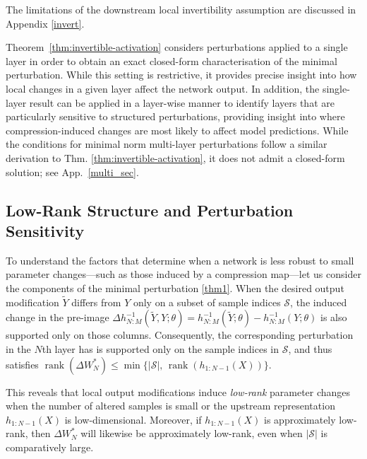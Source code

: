 \documentclass{article}
\theoremstyle{plain}
\theoremstyle{definition}
\theoremstyle{remark}
\begin{document}
The limitations of the downstream local invertibility assumption are discussed in Appendix \ref{invert}.

Theorem~\ref{thm:invertible-activation} considers perturbations applied to a single layer in order to obtain an exact closed-form characterisation of the minimal perturbation. While this setting is restrictive, it provides precise insight into how local changes in a given layer affect the network output.
In addition, the single-layer result can be applied in a layer-wise manner to identify layers that are particularly sensitive to structured perturbations, providing insight into where compression-induced changes are most likely to affect model predictions.
While the conditions for minimal norm multi-layer perturbations follow a similar derivation to Thm. \ref{thm:invertible-activation}, it does not admit a closed-form solution; see App.~\ref{multi_sec}.



\subsection{Low-Rank Structure and Perturbation Sensitivity}
To understand the factors that determine when a network is less robust to small parameter changes—such as those induced by a compression map—let us consider the components of the minimal perturbation \ref{thm1}.
 When the desired output modification $\tilde Y$ differs from $Y$ only on a subset of sample indices $\mathcal S$, the induced change in the pre-image $\Delta h_{N:M}^{-1}(\tilde Y, Y;\theta)=h_{N:M}^{-1}(\tilde Y;\theta) - h_{N:M}^{-1}(Y;\theta)$ is also supported only on those columns.
Consequently, the corresponding perturbation in the $N$th layer has is supported only on the sample indices in $\mathcal S$, and thus satisfies
\(
\operatorname{rank}(\Delta W_N^\ast)
   \le \min\{|\mathcal S|,\, \operatorname{rank}(h_{1:N-1}(X))\}.
\)

This reveals that local output modifications induce \emph{low-rank} parameter changes when the number of altered samples is small or the upstream representation $h_{1:N-1}(X)$ is low-dimensional. Moreover, if $h_{1:N-1}(X)$ is approximately low-rank, then $\Delta W_N^\ast$
 will likewise be approximately low-rank, even when $|\mathcal S|$ is comparatively large.
\end{document}
